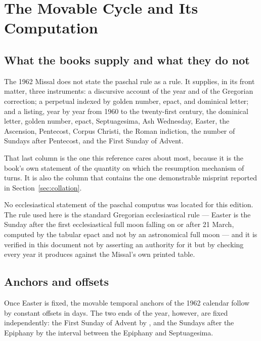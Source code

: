 \section{The Movable Cycle and Its Computation}
\label{sec:movable}

\subsection{What the books supply and what they do not}

The 1962 Missal does not state the paschal rule as a rule. It supplies, in its front matter,
three instruments: a discursive account of the year and of the Gregorian correction; a
perpetual  indexed by golden number, epact, and
dominical letter; and a  listing, year by year from
1960 to the twenty-first century, the dominical letter, golden number, epact, Septuagesima, Ash
Wednesday, Easter, the Ascension, Pentecost, Corpus Christi, the Roman indiction, the number of
Sundays after Pentecost, and the First Sunday of Advent.

That last column is the one this reference cares about most, because it is the book's own
statement of the quantity on which the resumption mechanism of  turns. It is also the
column that contains the one demonstrable misprint reported in Section~\ref{sec:collation}.

No ecclesiastical statement of the paschal computus was located for this edition. The rule used
here is the standard Gregorian ecclesiastical rule — Easter is the Sunday after the first
ecclesiastical full moon falling on or after 21 March, computed by the tabular epact and not by
an astronomical full moon — and it is verified in this document not by asserting an authority
for it but by checking every year it produces against the Missal's own printed table.

\subsection{Anchors and offsets}

Once Easter is fixed, the movable temporal anchors of the 1962 calendar follow by constant
offsets in days. The two ends of the year, however, are fixed independently: the First Sunday of
Advent by , and the Sundays after the Epiphany by the interval between the Epiphany and
Septuagesima.

